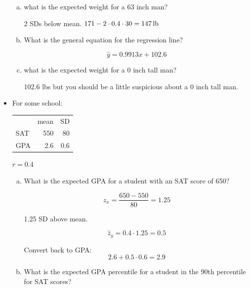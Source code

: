 \documentclass[letterpaper, landscape]{exam}
\begin{document}
\begin{itemize}
\begin{enumerate}[(a)]
        \item what is the expected weight for a 63 inch man?
        \begin{solution}
          2 SDs below mean.  $171 - 2 \cdot 0.4 \cdot 30 = \unit[147]{lb}$
        \end{solution}

        \item What is the general equation for the regression line?
          \begin{solution}
            \[
              \hat{y} = 0.9913 x + 102.6
            \]
          \end{solution}

        \item what is the expected weight for a 0 inch tall man?
        \begin{solution}
          102.6 lbs but you should be a little suspicious about a 0 inch tall
          man.
        \end{solution}

      \end{enumerate}

    \item For some school:
      \begin{tabular}[H]{lrr}
            & mean   & SD \\
        SAT & 550  & 80 \\
        GPA & 2.6 & 0.6 \\
      \end{tabular}

      $r = 0.4$

      \begin{enumerate}[(a)]
        \item
          What is the expected GPA for a student with an SAT score of 650?

          \begin{solution}
            \[
              z_x = \frac{650 - 550}{80} = 1.25
            \]

            1.25 SD above mean.

            \[
              \hat{z}_y = 0.4 \cdot 1.25 = 0.5
            \]

            Convert back to GPA\@:
            \[
              2.6 + 0.5 \cdot 0.6 = 2.9
            \]
          \end{solution}

        \item
          What is the expected GPA percentile for a student in the 90th
          percentile for SAT scores?


\end{enumerate}
\end{itemize}
\end{document}
